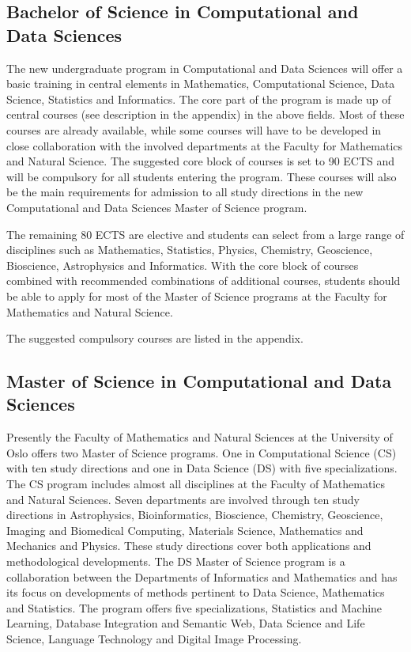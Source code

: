 \documentclass[oneside,final,10pt]{article}
\begin{document}
\subsection*{Bachelor of Science in Computational and Data Sciences}

The new undergraduate program in Computational and Data Sciences will offer a basic training in central elements in Mathematics, Computational Science, Data Science, Statistics and Informatics. 
The core part of the program is made up of central courses (see description in the appendix) in the above fields. Most of these courses are already available, while some courses will have to be developed in close collaboration with the involved departments at the Faculty for Mathematics and Natural Science.
The suggested core block of courses is set to 90 ECTS and will be compulsory for all students entering the program. These courses will also be the main requirements for admission to
 all study directions in the new Computational and Data Sciences Master of Science program.


The remaining 80 ECTS are elective and students can select from a large range of disciplines such as Mathematics, Statistics, Physics, Chemistry, Geoscience, Bioscience, Astrophysics and Informatics. 
With the core block of courses combined with recommended combinations of additional courses,  students should be able to apply for most of the Master of Science programs at the Faculty for Mathematics and Natural Science. 

The suggested compulsory courses are listed in the appendix.

\subsection*{Master of Science in Computational and Data Sciences}

Presently the Faculty of Mathematics and Natural Sciences at the University of Oslo offers two Master of Science programs. One in Computational Science (CS) with ten study directions and one in Data Science (DS) with five specializations. The CS program includes almost all disciplines at the Faculty of Mathematics and Natural Sciences. Seven departments are involved through ten study directions in Astrophysics, Bioinformatics, Bioscience, Chemistry, Geoscience, Imaging and Biomedical Computing, Materials Science, Mathematics and Mechanics and Physics. These study directions cover both applications and methodological developments. The DS Master of Science program is a collaboration between the Departments of Informatics and Mathematics and has its focus on developments of methods pertinent to Data Science, Mathematics  and Statistics.  
The program offers five specializations, 
Statistics and Machine Learning, Database Integration and Semantic Web, 
Data Science and Life Science, Language Technology and Digital Image Processing. 
\end{document}
